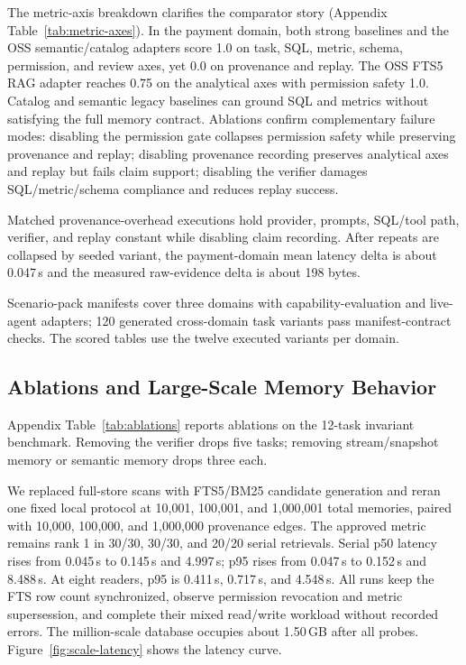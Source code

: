 \documentclass[10pt]{article}
\begin{document}
The metric-axis breakdown clarifies the comparator story (Appendix Table~\ref{tab:metric-axes}). In the payment domain, both strong baselines and the OSS semantic/catalog adapters score 1.0 on task, SQL, metric, schema, permission, and review axes, yet 0.0 on provenance and replay. The OSS FTS5 RAG adapter reaches 0.75 on the analytical axes with permission safety 1.0. Catalog and semantic legacy baselines can ground SQL and metrics without satisfying the full memory contract. Ablations confirm complementary failure modes: disabling the permission gate collapses permission safety while preserving provenance and replay; disabling provenance recording preserves analytical axes and replay but fails claim support; disabling the verifier damages SQL/metric/schema compliance and reduces replay success.

Matched provenance-overhead executions hold provider, prompts, SQL/tool path, verifier, and replay constant while disabling claim recording. After repeats are collapsed by seeded variant, the payment-domain mean latency delta is about 0.047\,s and the measured raw-evidence delta is about 198 bytes.

Scenario-pack manifests cover three domains with capability-evaluation and live-agent adapters; 120 generated cross-domain task variants pass manifest-contract checks. The scored tables use the twelve executed variants per domain.

\subsection{Ablations and Large-Scale Memory Behavior}
Appendix Table~\ref{tab:ablations} reports ablations on the 12-task invariant benchmark. Removing the verifier drops five tasks; removing stream/snapshot memory or semantic memory drops three each.

We replaced full-store scans with FTS5/BM25 candidate generation and reran one fixed local protocol at 10{,}001, 100{,}001, and 1{,}000{,}001 total memories, paired with 10{,}000, 100{,}000, and 1{,}000{,}000 provenance edges. The approved metric remains rank 1 in 30/30, 30/30, and 20/20 serial retrievals. Serial p50 latency rises from 0.045\,s to 0.145\,s and 4.997\,s; p95 rises from 0.047\,s to 0.152\,s and 8.488\,s. At eight readers, p95 is 0.411\,s, 0.717\,s, and 4.548\,s. All runs keep the FTS row count synchronized, observe permission revocation and metric supersession, and complete their mixed read/write workload without recorded errors. The million-scale database occupies about 1.50\,GB after all probes. Figure~\ref{fig:scale-latency} shows the latency curve.
\end{document}
